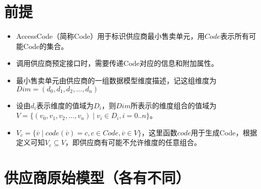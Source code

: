 \documentclass[a4paper]{article}
\begin{document}
\section{前提}

\begin{itemize}
    \item AccessCode（简称Code）用于标识供应商最小售卖单元，用$Code$表示所有可能Code的集合。
    \item 调用供应商预定接口时，需要传递Code对应的信息和附加属性。
    \item 最小售卖单元由供应商的一组数据模型维度描述，记这组维度为$Dim=(d_0,d_1,d_2,\dots,d_n)$
    \item 设由${d_i}$表示维度的值域为$D_i$，则$Dim$所表示的维度组合的值域为$V = \{( v_0,v_1,v_2,\dots,v_n) \mid v_i \in D_i, i = 0..n\}$。
    \item $V_c = \{ \overline v \mid code(\overline v) = c, c \in Code, \overline v \in V\}$，这里函数$code$用于生成Code，根据定义可知$V_c \subseteq V$，即供应商有可能不允许维度的任意组合。
\end{itemize}

\section{ 供应商原始模型（各有不同）}
\end{document}
